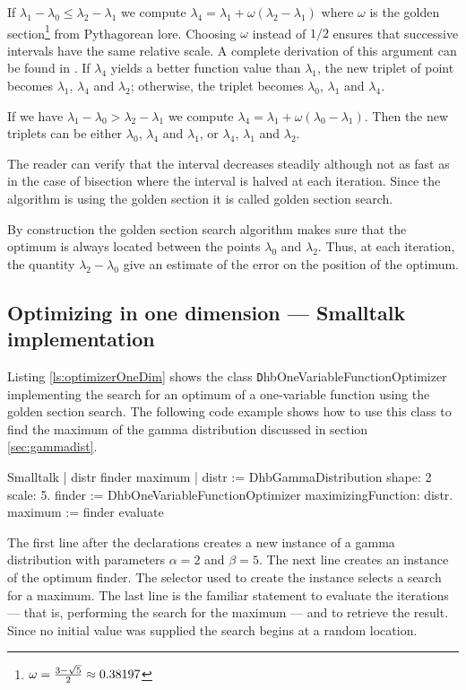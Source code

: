 If $\lambda_1-\lambda_0\leq\lambda_2-\lambda_1$ we compute
$\lambda_4 =\lambda_1 + \omega\left(\lambda_2-\lambda_1\right)$
where $\omega$ is the golden
section\footnote{$\omega={3-\sqrt{5}\over 2}\approx0.38197$} from
Pythagorean lore. Choosing $\omega$ instead of $1/2$ ensures that
successive intervals have the same relative scale. A complete
derivation of this argument can be found in \cite{Press}. If
$\lambda_4$ yields a better function value than $\lambda_1$, the
new triplet of point becomes $\lambda_1$, $\lambda_4$ and
$\lambda_2$; otherwise, the triplet becomes $\lambda_0$,
$\lambda_1$ and $\lambda_4$.

If we have $\lambda_1-\lambda_0>\lambda_2-\lambda_1$ we compute
$\lambda_4 =\lambda_1 + \omega\left(\lambda_0-\lambda_1\right)$.
Then the new triplets can be either $\lambda_0$, $\lambda_4$ and
$\lambda_1$, or $\lambda_4$, $\lambda_1$ and $\lambda_2$.


The reader can verify that the interval decreases steadily
although not as fast as in the case of bisection where the
interval is halved at each iteration. Since the algorithm is using
the golden section it is called golden section search.

By construction the golden section search algorithm makes sure
that the optimum is always located between the points $\lambda_0$
and $\lambda_2$. Thus, at each iteration, the quantity
$\lambda_2-\lambda_0$ give an estimate of the error on the
position of the optimum.

\subsection{Optimizing in one dimension --- Smalltalk implementation}
 Listing
\ref{ls:optimizerOneDim} shows the class {\texttt
DhbOneVariableFunctionOptimizer} implementing the search for an
optimum of a one-variable function using the golden section
search. The following code example shows how to use this class to
find the maximum of the gamma distribution discussed in section
\ref{sec:gammadist}.

\begin{displaycode}{Smalltalk}
 | distr finder maximum |
 distr := DhbGammaDistribution shape: 2 scale: 5.
 finder := DhbOneVariableFunctionOptimizer maximizingFunction: distr.
 maximum := finder evaluate
\end{displaycode}

The first line after the declarations creates a new instance of a
gamma distribution with parameters $\alpha = 2$ and $\beta = 5$.
The next line creates an instance of the optimum finder. The
selector used to create the instance selects a search for a
maximum. The last line is the familiar statement to evaluate the
iterations --- that is, performing the search for the maximum ---
and to retrieve the result. Since no initial value was supplied
the search begins at a random location.

